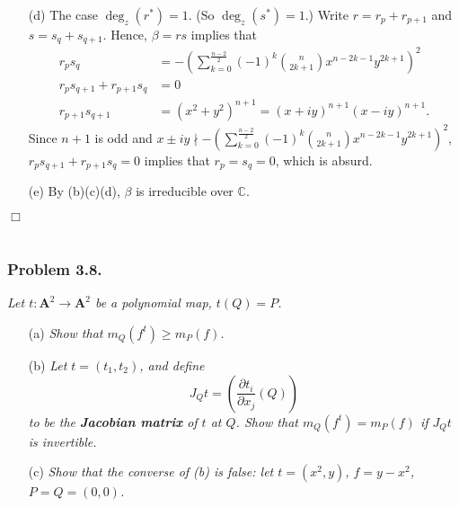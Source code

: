 \documentclass{article}
\begin{document}
\begin{enumerate}
\begin{enumerate}
  \item[(d)]
    The case $\deg_{z}(r^{*}) = 1$. (So $\deg_{z}(s^{*}) = 1$.)
    Write $r = r_p + r_{p+1}$ and $s = s_q + s_{q+1}$.
    Hence, $\beta = rs$ implies that
    \begin{align*}
      r_p s_q
      &= -\left( \sum_{k=0}^{\frac{n-2}{2}}
        (-1)^k {n \choose 2k+1} x^{n-2k-1} y^{2k+1} \right)^2 \\
      r_p s_{q+1} + r_{p+1}s_q
      &= 0 \\
      r_{p+1} s_{q+1}
      &= (x^2+y^2)^{n+1} = (x+iy)^{n+1}(x-iy)^{n+1}.
    \end{align*}
    Since $n+1$ is odd and
    $x \pm iy \nmid
    -\left( \sum_{k=0}^{\frac{n-2}{2}} (-1)^k {n \choose 2k+1} x^{n-2k-1} y^{2k+1} \right)^2$,
    $r_p s_{q+1} + r_{p+1}s_q = 0$ implies that $r_p = s_q = 0$, which is absurd.

  \item[(e)]
    By (b)(c)(d), $\beta$ is irreducible over $\mathbb{C}$.
  \end{enumerate}
\end{enumerate}
$\Box$ \\\\






\subsubsection*{Problem 3.8.}
\emph{Let $t: \mathbf{A}^2 \to \mathbf{A}^2$ be a polynomial map, $t(Q) = P$.}
\begin{enumerate}
\item[(a)]
  \emph{Show that $m_Q(f^t) \geq m_P(f)$.}

\item[(b)]
  \emph{Let $t = (t_1, t_2)$, and define
  \[
    J_Qt = \left( \frac{\partial t_i}{\partial x_j}(Q) \right)
  \]
  to be the \textbf{Jacobian matrix} of $t$ at $Q$.
  Show that $m_Q(f^t) = m_P(f)$ if $J_Qt$ is invertible.}

\item[(c)]
  \emph{Show that the converse of (b) is false:
  let $t = (x^2, y)$, $f = y - x^2$, $P = Q = (0, 0)$.} \\
\end{enumerate}
\end{document}
